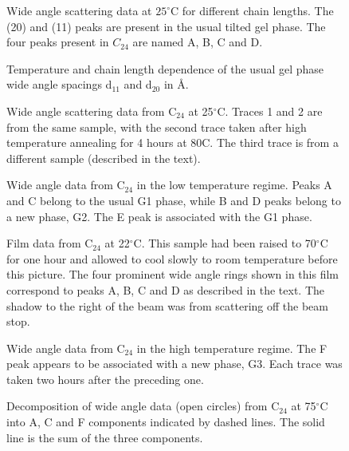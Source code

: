 \begin{figure}
\caption{Wide angle scattering data at $25^{\circ}$C for different chain 
lengths. The (20) and (11) peaks are present in the usual tilted gel phase. 
The four peaks present in $C_{24}$ are named A, B, C and D.
\label{fig1}}
\end{figure}

\begin{figure}
\caption{Temperature and chain length dependence of the usual
gel phase wide angle spacings d$_{11}$ and d$_{20}$ in {\AA}.
\label{fig2}}
\end{figure}

\begin{figure}
\caption{Wide angle scattering data from C$_{24}$ at 25$^{\circ}$C. 
Traces 1 and 2 are from the same sample, with the second trace taken after high
temperature annealing for 4 hours at 80C. The third trace is from a 
different sample (described in the text).
\label{fig3}}
\end{figure}

\begin{figure}
\caption{Wide angle data from C$_{24}$ in the low temperature regime. Peaks
A and C belong to the usual G1 phase, while B and D peaks belong to a new
phase, G2. The E peak is associated with the G1 phase.
\label{fig4}}
\end{figure}

\begin{figure}
\caption{Film data from C$_{24}$ at 22$^{\circ}$C. This sample had been
raised to 70$^{\circ}$C for one hour and allowed to cool slowly to room 
temperature before this picture. The four prominent wide angle rings shown in 
this film correspond to peaks A, B, C and D as described in the text. The 
shadow to the right of the beam was from scattering off the beam stop.
\label{fig5}}
\end{figure}

\begin{figure}
\caption{Wide angle data from C$_{24}$ in the high temperature regime. 
The F peak appears to be associated with a new phase, G3.
Each trace was taken two hours after the preceding one.
\label{fig6}}
\end{figure}

\begin{figure}
\caption{Decomposition of wide angle data (open circles) from C$_{24}$ 
at 75$^{\circ}$C into A, C and F components indicated by dashed lines.
The solid line is the sum of the three components.
\label{fig7}}
\end{figure}

